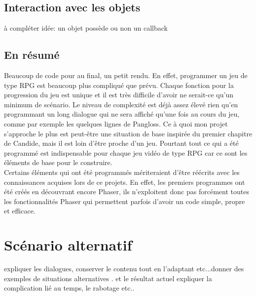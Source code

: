 \documentclass[11pt]{article}
\begin{document}
\subsection{Interaction avec les objets}
à compléter idée: un objet possède ou non un callback 


\subsection{En résumé}
Beaucoup de code pour au final, un petit rendu. En effet, programmer un jeu de type RPG est beaucoup plus compliqué que prévu. Chaque fonction pour la progression du jeu est unique et il est très difficile d'avoir ne serait-ce qu'un minimum de scénario. Le niveau de complexité est déjà assez élevé rien qu'en programmant un long dialogue qui ne sera affiché qu'une fois au cours du jeu, comme par exemple les quelques lignes de Pangloss. Ce à quoi mon projet s'approche le plus est peut-être une situation de base inspirée du premier chapitre de Candide, mais il est loin d'être proche d'un jeu. Pourtant tout ce qui a été programmé est indispensable pour chaque jeu vidéo de type RPG car ce sont les éléments de base pour le construire. \\

Certains éléments qui ont été programmés mériteraient d'être réécrits avec les connaissances acquises lors de ce projets. En effet, les premiers programmes ont été créés en découvrant encore Phaser, ils n'exploitent donc pas forcément toutes les fonctionnalités Phaser qui permettent parfois d'avoir un code simple, propre et efficace.\\
\section{Scénario alternatif}
expliquer les dialogues, conserver le contenu tout en l'adaptant etc...donner des exemples de situations alternatives . et le résultat actuel
expliquer la complication lié au temps, le rabotage etc..
\end{document}
